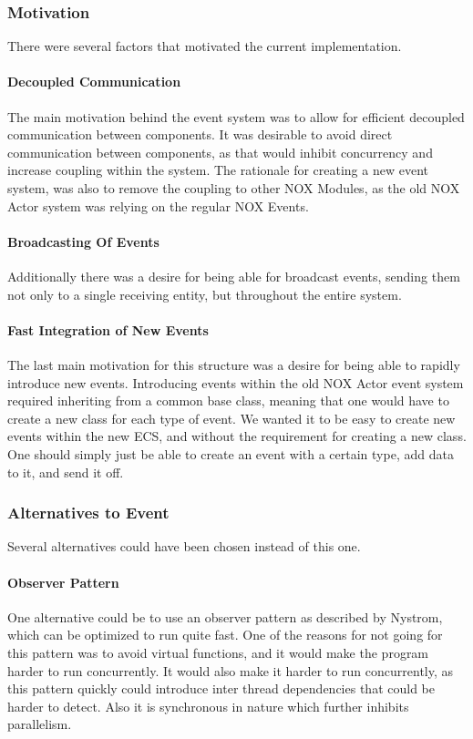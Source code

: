 \subsubsection{Motivation}
There were several factors that motivated the current implementation.

\paragraph{Decoupled Communication}
The main motivation behind the event system was to allow for efficient decoupled
communication between components.
It was desirable to avoid direct communication between components, as
that would inhibit concurrency and increase coupling within the system.
The rationale for creating a new event system, was also to remove the coupling
to other NOX Modules, as the old NOX Actor system was relying on the regular NOX Events.

\paragraph{Broadcasting Of Events}
Additionally there was a desire for being able for broadcast events,
sending them not only to a single receiving entity, but throughout the entire
system.

\paragraph{Fast Integration of New Events}
The last main motivation for this structure was a desire for being able to rapidly introduce new events.
Introducing events within the old NOX Actor event system required inheriting from a common base class,
meaning that one would have to create a new class for each type of event.
We wanted it to be easy to create new events within the new ECS, and without the requirement for creating
a new class. One should simply just be able to create an event with a certain type, add data to it,
and send it off.

\subsubsection{Alternatives to Event}
Several alternatives could have been chosen instead of this one.

\paragraph{Observer Pattern}
One alternative could be to use an observer pattern as described by Nystrom\cite[Observer]{game_programming_patterns},
which can be optimized to run quite fast.
One of the reasons for not going for this pattern was to avoid virtual functions,
and it would make the program harder to run concurrently.
It would also make it harder to run concurrently,
as this pattern quickly could introduce inter thread dependencies
that could be harder to detect.
Also it is synchronous in nature which further inhibits parallelism.

